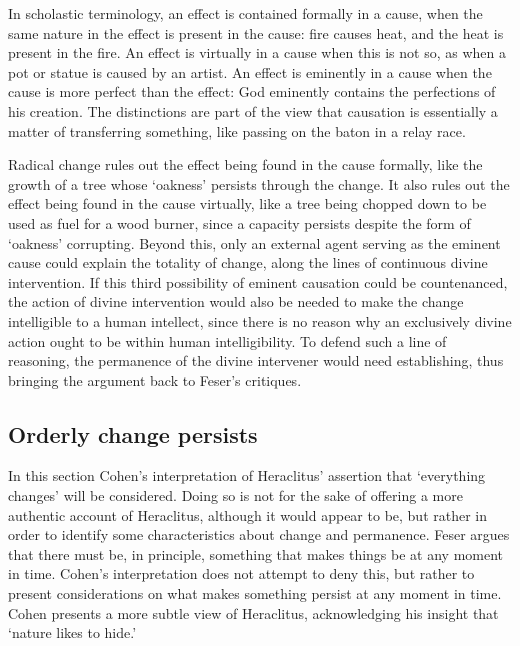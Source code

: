 \begin{quoting}
In scholastic terminology, an effect is contained formally in a cause, when the same nature in the effect is present in the cause: fire causes heat, and the heat is present in the fire. An effect is virtually in a cause when this is not so, as when a pot or statue is caused by an artist. An effect is eminently in a cause when the cause is more perfect than the effect: God eminently contains the perfections of his creation. The distinctions are part of the view that causation is essentially a matter of transferring something, like passing on the baton in a relay race. \parencite[][143]{blackburn1994oxford}
\end{quoting}

Radical change rules out the effect being found in the cause formally, like the growth of a tree whose `oakness' persists through the change. It also rules out the effect being found in the cause virtually, like a tree being chopped down to be used as fuel for a wood burner, since a capacity persists despite the form of `oakness' corrupting. Beyond this, only an external agent serving as the eminent cause could explain the totality of change, along the lines of continuous divine intervention. If this third possibility of eminent causation could be countenanced, the action of divine intervention would also be needed to make the change intelligible to a human intellect, since there is no reason why an exclusively divine action ought to be within human intelligibility. To defend such a line of reasoning, the permanence of the divine intervener would need establishing, thus bringing the argument back to Feser's critiques.


\subsection{Orderly change persists}

In this section Cohen's interpretation of Heraclitus' assertion that `everything changes' will be considered.
Doing so is not for the sake of offering a more authentic account of Heraclitus, although it would appear to be, but rather in order to identify some characteristics about change and permanence. Feser argues that there must be, in principle, something that makes things be at any moment in time. Cohen's interpretation does not attempt to deny this, but rather to present considerations on what makes something persist at any moment in time. Cohen presents a more subtle view of Heraclitus, acknowledging his insight that `nature likes to hide.' \autocite[][34]{fitt1983ancilla}

